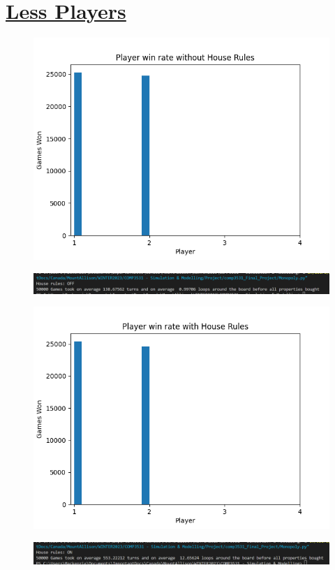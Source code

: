 \documentclass[a4paper,reqno,12pt]{report}
\begin{document}
\section*{\underline{Less Players}}
\begin{figure}[h]
\includegraphics[width=15cm]{2_player_test_noHouseRules.png}
\centering
\end{figure}
\begin{figure}[h]
\includegraphics[width=15cm]{2_player_test_noHouseRules_averages.png}
\centering
\end{figure}
\begin{figure}[h]
\includegraphics[width=15cm]{2_player_test.png}
\centering
\end{figure}
\begin{figure}[h]
\includegraphics[width=15cm]{2_player_test_HouseRules.png}
\centering
\end{figure}
\clearpage
\end{document}
